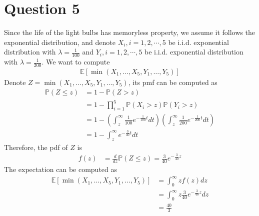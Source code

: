 \documentclass[12pt]{article}
\begin{document}
\section*{Question 5}
\begin{solution}
Since the life of the light bulbs has memoryless property, we assume it follows the exponential distribution, and denote $X_i, i=1,2,\cdots,5$ be i.i.d. exponential distribution with $\lambda = \frac{1}{100}$ and $Y_i, i=1,2,\cdots,5$ be i.i.d. exponential distribution with $\lambda = \frac{1}{200}$.  We want to compute
\begin{align}
\mathbb{E}\left[\min(X_1,\ldots,X_5,Y_1,\ldots,Y_5)\right]
\end{align}
Denote $Z=\min(X_1,\ldots,X_5,Y_1,\ldots,Y_5)$, its pmf can be computed as
\begin{align}
\mathbb{P}\left(Z\leq z\right) &= 1 - \mathbb{P}\left(Z> z\right)\nonumber\\
&= 1-\prod_{i=1}^5\mathbb{P}\left(X_i>z\right)\mathbb{P}\left(Y_i>z\right)\nonumber\\
&=1-\left(\int_z^\infty\frac{1}{100}e^{-\frac{1}{100}t}dt\right)\left(\int_z^\infty\frac{1}{200}e^{-\frac{1}{200}t}dt\right)\nonumber\\
&=1-\int_z^\infty e^{-\frac{3}{40}t}dt
\end{align}
Therefore, the pdf of $Z$ is 
\begin{align}
f(z) &= \frac{d}{dz} \mathbb{P}\left(Z\leq z\right)  = \frac{3}{40} e^{-\frac{3}{40}z}
\end{align}
The expectation can be computed as  
\begin{align}
\mathbb{E}\left[\min(X_1,\ldots,X_5,Y_1,\ldots,Y_5)\right] &= \int_0^\infty z f(z) dz \nonumber\\
&= \int_0^\infty z\frac{3}{40} e^{-\frac{3}{40}z} dz \nonumber\\
&=\frac{40}{3}
\end{align}
\end{solution}
\end{document}
